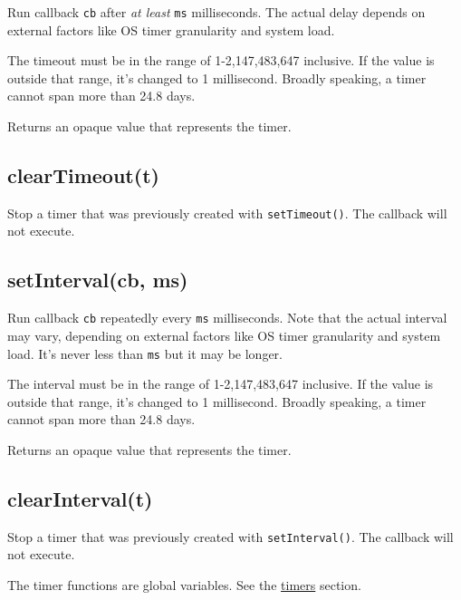 Run callback \texttt{cb} after \emph{at least} \texttt{ms} milliseconds.
The actual delay depends on external factors like OS timer granularity
and system load.

The timeout must be in the range of 1-2,147,483,647 inclusive. If the
value is outside that range, it's changed to 1 millisecond. Broadly
speaking, a timer cannot span more than 24.8 days.

Returns an opaque value that represents the timer.

\subsection{clearTimeout(t)}

Stop a timer that was previously created with \texttt{setTimeout()}. The
callback will not execute.

\subsection{setInterval(cb, ms)}

Run callback \texttt{cb} repeatedly every \texttt{ms} milliseconds. Note
that the actual interval may vary, depending on external factors like OS
timer granularity and system load. It's never less than \texttt{ms} but
it may be longer.

The interval must be in the range of 1-2,147,483,647 inclusive. If the
value is outside that range, it's changed to 1 millisecond. Broadly
speaking, a timer cannot span more than 24.8 days.

Returns an opaque value that represents the timer.

\subsection{clearInterval(t)}

Stop a timer that was previously created with \texttt{setInterval()}.
The callback will not execute.

The timer functions are global variables. See the
\href{timers.html}{timers} section.
